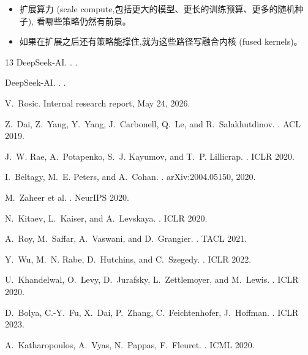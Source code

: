 \documentclass[10pt,UTF8]{ctexart}
\begin{document}
\begin{itemize}
\item 扩展算力 (scale compute,包括更大的模型、更长的训练预算、更多的随机种子),
看哪些策略仍然有前景。
\item 如果在扩展之后还有策略能撑住,就为这些路径写融合内核 (fused kernels)。
\end{itemize}

\begingroup
\small
{}
\setlength{\itemsep}{0pt}
\begin{thebibliography}{13}
DeepSeek-AI.
.
.

DeepSeek-AI.
.
.

V.~Rosic.
\newblock Internal research report, May 24, 2026.

Z.~Dai, Z.~Yang, Y.~Yang, J.~Carbonell, Q.~Le, and R.~Salakhutdinov.
.
\newblock ACL 2019.

J.~W. Rae, A.~Potapenko, S.~J. Kayumov, and T.~P. Lillicrap.
.
\newblock ICLR 2020.

I.~Beltagy, M.~E. Peters, and A.~Cohan.
.
\newblock arXiv:2004.05150, 2020.

M.~Zaheer et al.
.
\newblock NeurIPS 2020.

N.~Kitaev, L.~Kaiser, and A.~Levskaya.
.
\newblock ICLR 2020.

A.~Roy, M.~Saffar, A.~Vaswani, and D.~Grangier.
.
\newblock TACL 2021.

Y.~Wu, M.~N. Rabe, D.~Hutchins, and C.~Szegedy.
.
\newblock ICLR 2022.

U.~Khandelwal, O.~Levy, D.~Jurafsky, L.~Zettlemoyer, and M.~Lewis.
.
\newblock ICLR 2020.

D.~Bolya, C.-Y.~Fu, X.~Dai, P.~Zhang, C.~Feichtenhofer, J.~Hoffman.
.
\newblock ICLR 2023.

A.~Katharopoulos, A.~Vyas, N.~Pappas, F.~Fleuret.
.
\newblock ICML 2020.
\end{thebibliography}
\endgroup
\end{document}
